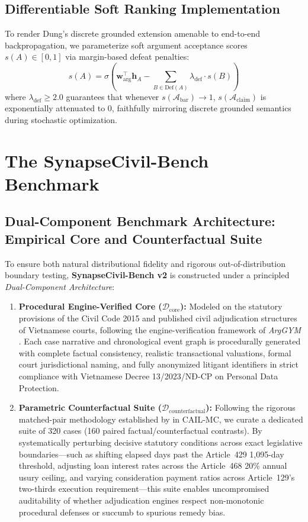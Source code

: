 \documentclass[11pt,a4paper]{article}
\begin{document}
\subsection{Differentiable Soft Ranking Implementation}
To render Dung's discrete grounded extension amenable to end-to-end backpropagation, we parameterize soft argument acceptance scores $s(A) \in [0, 1]$ via margin-based defeat penalties:
\begin{equation}
\label{eq:soft_dung}
s(A) = \sigma\left( \mathbf{w}_{\mathrm{arg}}^\top \mathbf{h}_A - \sum_{B \in \mathrm{Def}(A)} \lambda_{\mathrm{def}} \cdot s(B) \right)
\end{equation}
where $\lambda_{\mathrm{def}} \ge 2.0$ guarantees that whenever $s(\mathcal{A}_{\mathrm{bar}}) \to 1$, $s(\mathcal{A}_{\mathrm{claim}})$ is exponentially attenuated to $0$, faithfully mirroring discrete grounded semantics during stochastic optimization.

\section{The SynapseCivil-Bench Benchmark}
\label{sec:benchmark}

\subsection{Dual-Component Benchmark Architecture: Empirical Core and Counterfactual Suite}
To ensure both natural distributional fidelity and rigorous out-of-distribution boundary testing, \textbf{SynapseCivil-Bench v2} is constructed under a principled \textit{Dual-Component Architecture}:
\begin{enumerate}[label=(\alph*)]
\item \textbf{Procedural Engine-Verified Core ($\mathcal{D}_{\text{core}}$):} Modeled on the statutory provisions of the Civil Code 2015 and published civil adjudication structures of Vietnamese courts, following the engine-verification framework of \textit{ArgGYM} \citep{deveci2026arggym}. Each case narrative and chronological event graph is procedurally generated with complete factual consistency, realistic transactional valuations, formal court jurisdictional naming, and fully anonymized litigant identifiers in strict compliance with Vietnamese Decree 13/2023/NĐ-CP on Personal Data Protection.
\item \textbf{Parametric Counterfactual Suite ($\mathcal{D}_{\text{counterfactual}}$):} Following the rigorous matched-pair methodology established by \citet{wang2026prose} in CAIL-MC, we curate a dedicated suite of 320 cases (160 paired factual/counterfactual contrasts). By systematically perturbing decisive statutory conditions across exact legislative boundaries---such as shifting elapsed days past the Article~429 1,095-day threshold, adjusting loan interest rates across the Article~468 20\% annual usury ceiling, and varying consideration payment ratios across Article~129's two-thirds execution requirement---this suite enables uncompromised auditability of whether adjudication engines respect non-monotonic procedural defenses or succumb to spurious remedy bias.
\end{enumerate}
\end{document}
